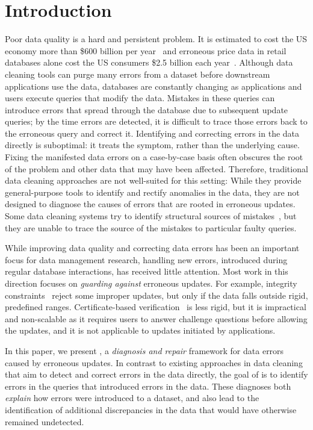 
\section{Introduction}
\label{s:intro}

Poor data quality is a hard and persistent problem.  It is estimated to cost the US economy more than \$600 billion
per year~\cite{eckerson2002} and erroneous price data in retail databases
alone cost the US consumers \$2.5 billion each year~\cite{Fan2008}. Although data
cleaning tools can purge many errors from a dataset before downstream 
applications use the data, databases are constantly changing as applications
and users execute queries that modify the data.
Mistakes in these queries can introduce errors that spread through the database
due to subsequent update queries; 
by the time errors are detected, it is difficult to trace those errors back to the 
erroneous query and correct it.
Identifying and correcting errors in the data directly is suboptimal: it treats the symptom,
rather than the underlying cause. Fixing the manifested data errors on a
case-by-case basis often obscures the root of the problem and other data that may have been
affected. Therefore, traditional data cleaning approaches are not well-suited
for this setting: While they provide general-purpose tools to identify and
rectify anomalies in the data, they are not designed to diagnose the causes of
errors that are rooted in erroneous updates.
Some data cleaning systems try to identify structural sources of
mistakes~\cite{wang2015}, but they are unable to trace the source of
the mistakes to particular faulty queries.

While improving data quality and correcting data errors has been an important
focus for data management research, handling new errors, introduced during
regular database interactions, has received little attention. Most work in
this direction focuses on \emph{guarding against} erroneous updates. For
example, integrity constraints~\cite{Khoussainova2006} reject some improper
updates, but only if the data falls outside rigid, predefined ranges.
Certificate-based verification~\cite{Chen2011} is less rigid, but it is
impractical and non-scalable as it requires users to answer challenge
questions before allowing the updates, and it is not applicable to updates
initiated by applications.


In this paper, we present \sys, a \emph{diagnosis and repair} framework for data errors
caused by erroneous updates. In contrast to existing approaches in data
cleaning that aim to detect and correct errors in the data directly, the goal
of \sys is to identify errors in the queries that introduced errors in the
data. These diagnoses both \emph{explain} how errors were introduced to a
dataset, and also lead to the identification of additional discrepancies in
the data that would have otherwise remained undetected.


